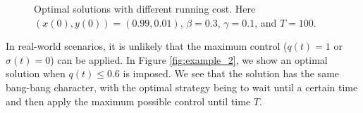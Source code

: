 \documentclass[english,12pt,letter]{article}
\begin{document}
\begin{figure}
    \centering
    \caption{Optimal solutions with different running cost.  Here $(x(0),y(0)) = (0.99,0.01)$, $\beta=0.3$, $\gamma=0.1$, and $T=100$.\label{fig:varying_c2}}
\end{figure}

In real-world scenarios, it is unlikely that the maximum control ($q(t)=1$ or $\sigma(t)=0$) can be
applied.  In Figure \ref{fig:example_2}, we show an optimal solution when $q(t)\le 0.6$ is imposed.  We see that
the solution has the same bang-bang character, with the optimal strategy being to wait
until a certain time and then apply the maximum possible control until time $T$.
\end{document}
